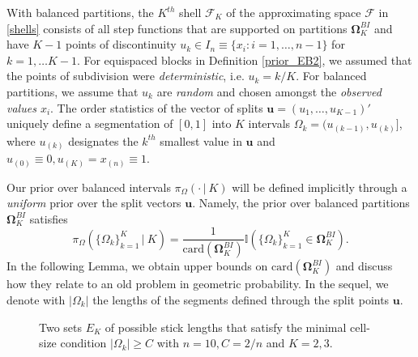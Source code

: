 \documentclass{article}
\newcommand{\1}{\mathbb{I}}
\newcommand{\bm}[1]{\boldsymbol{#1}}
\def\C {\,|\:}
\def\C {\,|\:}
\def\u{\bm{u}}
\theoremstyle{assumption}
\begin{document}
With balanced partitions, the $K^{th}$ shell  $\mathcal{F}_K$ of the approximating space  $\mathcal{F}$ in  \eqref{shells} consists of all step functions that are supported on partitions $\bm{\Omega}_{K}^{BI}$ and have  $K-1$ points of discontinuity $u_k\in I_n\equiv \{x_i:i=1,\dots,n-1\}$ for  $k=1,\dots K-1$. For equispaced blocks in Definition \ref{prior_EB2},  we assumed that  the points of subdivision were {\sl deterministic}, i.e. $u_k=k/K$. For balanced partitions, 
we assume that  $u_k$ are {\sl random} and chosen amongst the {\sl observed values $x_i$}.  
The order statistics of the vector of splits $\u=(u_1,\dots,u_{K-1})'$ uniquely  define a  segmentation of $[0,1]$ into $K$ intervals $\Omega_k=(u_{(k-1)},u_{(k)}]$, where  $u_{(k)}$ designates the $k^{th}$ smallest value in $\u$ and $u_{(0)}\equiv0, u_{(K)}=x_{(n)}\equiv1$. 

Our prior over balanced  intervals $\pi_\Omega(\cdot\C K)$ will be defined implicitly through a {\sl uniform} prior  over  the split vectors $\u$.
Namely, the prior over balanced partitions $\bm{\Omega}^{BI}_K$ satisfies
\begin{equation}\label{prior_omega}
\pi_{\Omega}(\{\Omega_k\}_{k=1}^K\C K)=\frac{1}{\mathrm{card}(\bm{\Omega}^{BI}_K)} \1\left(\{\Omega_k\}_{k=1}^K\in\bm{\Omega}^{BI}_K\right).
\end{equation}
In the following Lemma, we obtain  upper bounds on $\mathrm{card}(\bm{\Omega}^{BI}_K)$ and discuss how they relate to an old problem in geometric probability.
In the sequel, we denote with $|\Omega_k|$  the lengths of the segments defined through the split points $\u$.


\begin{figure}[!t]
\caption{Two sets $E_K$ of possible stick lengths that satisfy the minimal cell-size condition $|\Omega_k|\geq C$ with $n=10, C=2/n$ and $K=2,3$.}\label{fig:1}
\end{figure}
\end{document}
